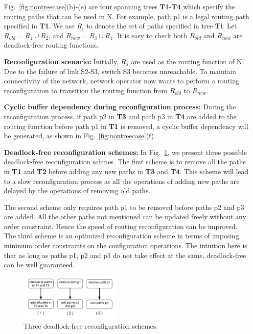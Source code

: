 Fig.~\ref{fig:nontreecase}(b)-(e) are four spanning trees \textbf{T1}-\textbf{T4} which specify the routing paths that can be used in N. For example, path p1 is a legal routing path specified in \textbf{T1}.  We use $R_i$ to denote the set of paths specified in tree \textbf{Ti}. Let $R_{old} = R_1 \cup R_2$, and $R_{new} = R_3 \cup R_4$. It is easy to check both $R_{old}$ and $R_{new}$ are deadlock-free routing functions. 

\textbf{Reconfiguration scenario:} Initially, $R_s$ are used as the routing function of N. Due to the failure of link S2-S3, switch S3 becomes unreachable. To maintain connectivity of the network, network operator now wants to perform a routing reconfiguration to transition the routing function from $R_{old}$ to $R_{new}$.

\textbf{Cyclic buffer dependency during reconfiguration process:} During the reconfiguration process, if path p2 in \textbf{T3} and path p3 in \textbf{T4} are added to the routing function before path p1 in \textbf{T1} is removed, a cyclic buffer dependency will be generated, as shown in Fig.~\ref{fig:nontreecase}(f).

\textbf{Deadlock-free reconfiguration schemes:} In Fig.~\ref{fig:dfschemes}, we present three possible deadlock-free reconfiguration schmes. The first scheme is to remove all the paths in \textbf{T1} and \textbf{T2} before adding any new paths in \textbf{T3} and \textbf{T4}. This scheme will lead to a slow reconfiguration process as all the operations of adding new paths are delayed by the operations of removing old paths. 

The second scheme only requires path p1 to be removed before paths p2 and p3 are added. All the other paths not mentioned can be updated freely without any order constraint. Hence the speed of routing reconfiguration can be improved. The third scheme is an optimized reconfiguration scheme in terms of imposing minimum order constraints on the configuration operations. The intuition here is that as long as paths p1, p2 and p3 do not take effect at the same, deadlock-free can be well guaranteed. 



\begin{figure}[t]
	\centering
	\includegraphics[width=0.45\textwidth] {figs/nontreecase_dfschemes}
	\caption{Three deadlock-free reconfiguration schemes.}\label{fig:dfschemes}
	\vspace{-0.2in}
\end{figure}

